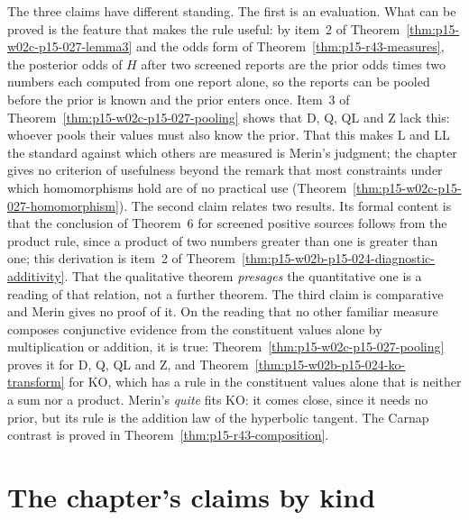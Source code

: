 The three claims have different standing. The first is an evaluation.
What can be proved is the feature that makes the rule useful: by
item~2 of Theorem~\ref{thm:p15-w02c-p15-027-lemma3} and the odds form of
Theorem~\ref{thm:p15-r43-measures}, the posterior odds of \(H\) after two
screened reports are the prior odds times two numbers each computed
from one report alone, so the reports can be pooled before the prior is
known and the prior enters once. Item~3 of
Theorem~\ref{thm:p15-w02c-p15-027-pooling} shows that D, Q, QL and Z lack
this: whoever pools their values must also know the prior. That this
makes L and LL the standard against which others are measured is
Merin's judgment; the chapter gives no criterion of usefulness beyond
the remark that most constraints under which homomorphisms hold are of
no practical use (Theorem~\ref{thm:p15-w02c-p15-027-homomorphism}). The
second claim relates two results. Its formal content is that the
conclusion of Theorem~6 for screened positive sources follows from the
product rule, since a product of two numbers greater than one is greater
than one; this derivation is item~2 of
Theorem~\ref{thm:p15-w02b-p15-024-diagnostic-additivity}. That the
qualitative theorem \emph{presages} the quantitative one is a reading
of that relation, not a further theorem. The third claim is comparative
and Merin gives no proof of it. On the reading that no other familiar
measure composes conjunctive evidence from the constituent values alone
by multiplication or addition, it is true:
Theorem~\ref{thm:p15-w02c-p15-027-pooling} proves it for D, Q, QL and Z,
and Theorem~\ref{thm:p15-w02b-p15-024-ko-transform} for KO, which has a
rule in the constituent values alone that is neither a sum nor a
product. Merin's \emph{quite} fits KO: it comes close, since it needs no
prior, but its rule is the addition law of the hyperbolic tangent. The
Carnap contrast is proved in Theorem~\ref{thm:p15-r43-composition}.

\section{The chapter's claims by kind}
\label{sec:p15-w02c-p15-027-claims}

